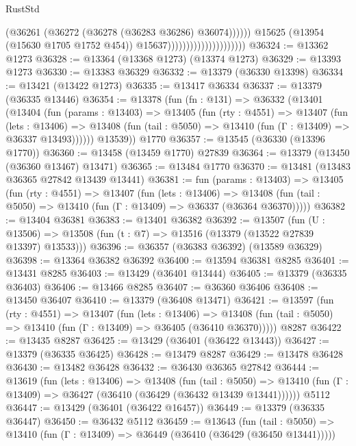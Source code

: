 \begin{lexlean}{RustStd}
\begin{coremodule}
                                                    (@36261
                                                      (@36272 (@36278 (@36283 @36286) @36074))))))
                                              @15625
                                              (@13954 (@15630 @1705 @1752 @454))
                                              @15637)))))))))))))))))))))
@36324 := @13362 @1273
@36328 := @13364 (@13368 @1273) (@13374 @1273)
@36329 := @13393 @1273
@36330 := @13383 @36329
@36332 := @13379 (@36330 @13398)
@36334 := @13421 (@13422 @1273)
@36335 := @13417 @36334
@36337 := @13379 (@36335 @13446)
@36354 := @13378
    (fun (fn : @131) =>
    @36332
      (@13401
        (@13404
          (fun (params : @13403) =>
          @13405
            (fun (rty : @4551) =>
            @13407
              (fun (lets : @13406) =>
              @13408 (fun (tail : @5050) => @13410 (fun (Γ : @13409) => @36337 @13493))))))
        @13539))
    @1770
@36357 := @13545 (@36330 (@13396 @1770))
@36360 := @13458 (@13459 @1770) @27839
@36364 := @13379 (@13450 (@36360 @13467) @13471)
@36365 := @13484 @1770
@36370 := @13481 (@13483 @36365 @27842 @13439 @13441)
@36381 := fun (params : @13403) =>
  @13405
    (fun (rty : @4551) =>
    @13407
      (fun (lets : @13406) =>
      @13408 (fun (tail : @5050) => @13410 (fun (Γ : @13409) => @36337 (@36364 @36370)))))
@36382 := @13404 @36381
@36383 := @13401 @36382
@36392 := @13507
    (fun (U : @13506) => @13508 (fun (t : @7) => @13516 (@13379 (@13522 @27839 @13397) @13533)))
@36396 := @36357 (@36383 @36392) (@13589 @36329)
@36398 := @13364 @36382 @36392
@36400 := @13594 @36381 @8285
@36401 := @13431 @8285
@36403 := @13429 (@36401 @13444)
@36405 := @13379 (@36335 @36403)
@36406 := @13466 @8285
@36407 := @36360 @36406
@36408 := @13450 @36407
@36410 := @13379 (@36408 @13471)
@36421 := @13597
    (fun (rty : @4551) =>
    @13407
      (fun (lets : @13406) =>
      @13408 (fun (tail : @5050) => @13410 (fun (Γ : @13409) => @36405 (@36410 @36370)))))
    @8287
@36422 := @13435 @8287
@36425 := @13429 (@36401 (@36422 @13443))
@36427 := @13379 (@36335 @36425)
@36428 := @13479 @8287
@36429 := @13478 @36428
@36430 := @13482 @36428
@36432 := @36430 @36365 @27842
@36444 := @13619
    (fun (lets : @13406) =>
    @13408
      (fun (tail : @5050) =>
      @13410 (fun (Γ : @13409) => @36427 (@36410 (@36429 (@36432 @13439 @13441))))))
    @5112
@36447 := @13429 (@36401 (@36422 @16457))
@36449 := @13379 (@36335 @36447)
@36450 := @36432 @5112
@36459 := @13643
    (fun (tail : @5050) => @13410 (fun (Γ : @13409) => @36449 (@36410 (@36429 (@36450 @13441)))))

\end{coremodule}
\end{lexlean}
